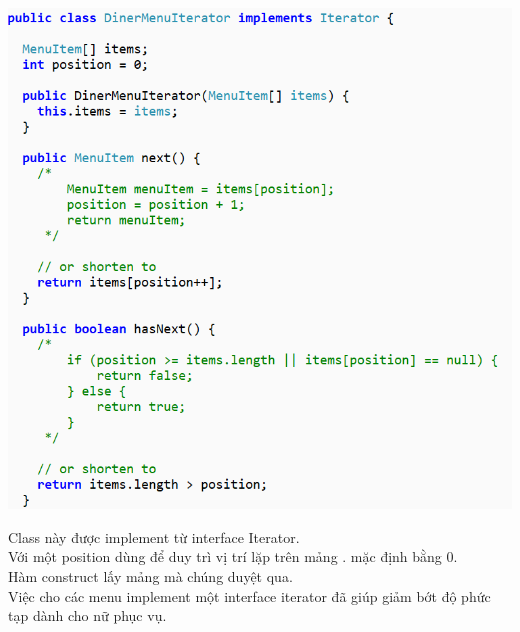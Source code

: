 \begin{center}
\includegraphics{GALLEYS/images/chapter3/images9}\\
\end{center}
Class này được implement từ interface Iterator.\\
Với một position dùng để duy trì vị trí lặp trên mảng . mặc định bằng 0.\\
Hàm construct lấy mảng mà chúng duyệt qua.\\
Việc cho các menu implement một interface iterator đã giúp giảm bớt độ phức tạp dành cho nữ phục vụ. \\

